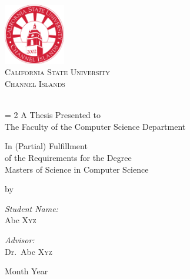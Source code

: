 \begin{titlepage}
\begin{center}
\includegraphics[width=0.20\textwidth]{media/csuci_logo.png}~\\[0.2cm]

\textsc{\LARGE California State University}\\[0.2cm]
\textsc{\LARGE Channel Islands}\\[1.0cm]

\HRule \\[0.2cm]
{\Large \bfseries \thesistitle \par}

\vspace{0.5 cm}

\baselineskip = 2\baselineskip
A Thesis Presented to \\
The Faculty of the Computer Science Department

\vspace{0.5 cm}

In (Partial) Fulfillment\\
of the Requirements for the Degree\\
Masters of Science in Computer Science\\

\vspace{0.5 cm }


by \\

\begin{minipage}{0.4\textwidth}
\begin{flushleft} \small
\emph{Student Name:}\\
Abc \textsc{Xyz}
\end{flushleft}
\end{minipage}
\begin{minipage}{0.4\textwidth}
\begin{flushright} \small
\emph{Advisor:} \\
Dr.~Abc \textsc{Xyz}
\end{flushright}
\end{minipage}

Month Year\\
\HRule \\[1.0cm]
\end{center}
\end{titlepage}
